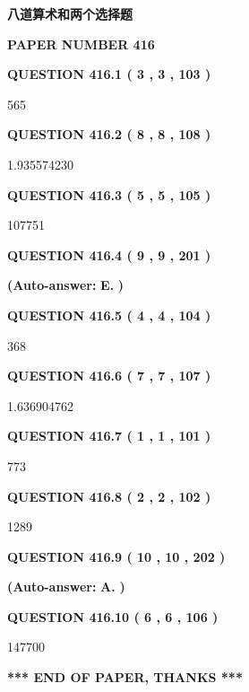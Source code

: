 \documentclass{ctexart}
\begin{document}
 
 
 
 
   
   
   
   
   
   
{\LARGE {\textbf{ 八道算术和两个选择题}}}
   
   
   
   
\setcounter{page}{ 
   416001 } 
   
   
 {\textbf{ \Large{ PAPER NUMBER  416  }}}
   
   
   
   
  
  
{\textbf{\large{QUESTION
416.1 
 ( 3 , 3 , 103 )
}}}

565
  
  
{\textbf{\large{QUESTION
416.2 
 ( 8 , 8 , 108 )
}}}

1.935574230
  
  
{\textbf{\large{QUESTION
416.3 
 ( 5 , 5 , 105 )
}}}

107751
  
  
{\textbf{\large{QUESTION
416.4 
 ( 9 , 9 , 201 )
}}}
 
 
{\textbf{(Auto-answer:}}
{\textbf{\large{
E.}}}
{\textbf{)}}
 
 
  
  
{\textbf{\large{QUESTION
416.5 
 ( 4 , 4 , 104 )
}}}

368
  
  
{\textbf{\large{QUESTION
416.6 
 ( 7 , 7 , 107 )
}}}

1.636904762
  
  
{\textbf{\large{QUESTION
416.7 
 ( 1 , 1 , 101 )
}}}

773
  
  
{\textbf{\large{QUESTION
416.8 
 ( 2 , 2 , 102 )
}}}

1289
  
  
{\textbf{\large{QUESTION
416.9 
 ( 10 , 10 , 202 )
}}}
 
 
{\textbf{(Auto-answer:}}
{\textbf{\large{
A.}}}
{\textbf{)}}
 
 
  
  
{\textbf{\large{QUESTION
416.10 
 ( 6 , 6 , 106 )
}}}

147700
   
   
   
   
\vspace{1.0in} 
{\textbf{\large{ *** END OF PAPER, THANKS *** }}} 
   
\end{document}
